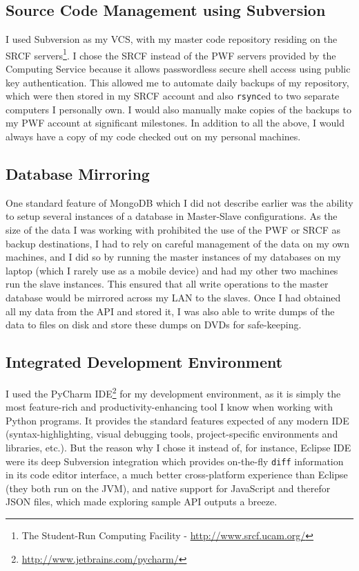 \documentclass[a4paper,12pt,twoside,notitlepage]{report}
\begin{document}
\subsection{Source Code Management using Subversion} 

I used Subversion as my VCS, with my master code repository residing on the SRCF
servers\footnote{The Student-Run Computing Facility -
\url{http://www.srcf.ucam.org/}}. I chose the SRCF instead of the PWF servers
provided by the Computing Service because it allows passwordless secure
shell access using public key authentication. This allowed me to automate daily
backups of my repository, which were then stored in my SRCF account and also
\texttt{rsync}ed to two separate computers I personally own. I would also
manually make copies of the backups to my PWF account at significant
milestones. In addition to all the above, I would always have a copy of my code
checked out on my personal machines.

\subsection{Database Mirroring}

One standard feature of MongoDB which I did not describe earlier was the ability
to setup several instances of a database in Master-Slave configurations. As the
size of the data I was working with prohibited the use of the PWF or SRCF as
backup destinations, I had to rely on careful management of the data on my own
machines, and I did so by running the master instances of my databases on my
laptop (which I rarely use as a mobile device) and had my other two machines run
the slave instances. This ensured that all write operations to the master
database would be mirrored across my LAN to the slaves. Once I had obtained all
my data from the API and stored it, I was also able to write dumps of the data
to files on disk and store these dumps on DVDs for safe-keeping.

\subsection{Integrated Development Environment}

I used the PyCharm IDE\footnote{\url{http://www.jetbrains.com/pycharm/}} for my
development environment, as it is simply the most feature-rich and
productivity-enhancing tool I know when working with Python programs. It
provides the standard features expected of any modern IDE (syntax-highlighting,
visual debugging tools, project-specific environments and libraries, etc.). But
the reason why I chose it instead of, for instance, Eclipse IDE were its deep
Subversion integration which provides on-the-fly \texttt{diff} information in
its code editor interface, a much better cross-platform experience than Eclipse
(they both run on the JVM), and native support for JavaScript and therefor JSON
files, which made exploring sample API outputs a breeze. 
\end{document}
